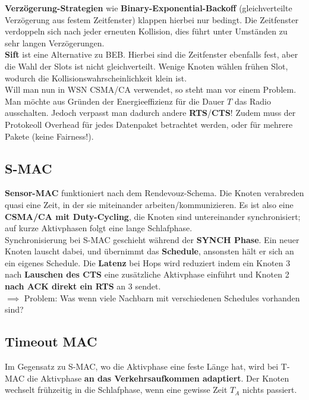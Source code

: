 \documentclass[a4paper]{article}
\begin{document}
\textbf{Verzögerung-Strategien} wie \textbf{Binary-Exponential-Backoff} (gleichverteilte Verzögerung aus festem Zeitfenster) klappen hierbei nur bedingt. Die Zeitfenster verdoppeln sich nach jeder erneuten Kollision, dies führt unter Umständen zu sehr langen Verzögerungen.\\

\textbf{Sift} ist eine Alternative zu BEB. Hierbei sind die Zeitfenster ebenfalls fest, aber die Wahl der Slots ist nicht gleichverteilt. Wenige Knoten wählen frühen Slot, wodurch die Kollisionswahrscheinlichkeit klein ist.\\

Will man nun in WSN CSMA/CA verwendet, so steht man vor einem Problem. Man möchte aus Gründen der Energieeffizienz für die Dauer $T$ das Radio ausschalten. Jedoch verpasst man dadurch andere \textbf{RTS}/\textbf{CTS}! Zudem muss der Protokeoll Overhead für jedes Datenpaket betrachtet werden, oder für mehrere Pakete (keine Fairness!).

\subsection{S-MAC}
\textbf{Sensor-MAC} funktioniert nach dem Rendevouz-Schema. Die Knoten verabreden quasi eine Zeit, in der sie miteinander arbeiten/kommunizieren. Es ist also eine \textbf{CSMA/CA mit Duty-Cycling}, die Knoten sind untereinander synchronisiert; auf kurze Aktivphasen folgt eine lange Schlafphase.\\

Synchronisierung bei S-MAC geschieht während der \textbf{SYNCH Phase}. Ein neuer Knoten lauscht dabei, und übernimmt das \textbf{Schedule}, ansonsten hält er sich an ein eigenes Schedule. Die \textbf{Latenz} bei Hops wird reduziert indem ein Knoten 3 nach \textbf{Lauschen des CTS} eine zusätzliche Aktivphase einführt und Knoten 2 \textbf{nach ACK direkt ein RTS} an 3 sendet.\\

$\implies$ Problem: Was wenn viele Nachbarn mit verschiedenen Schedules vorhanden sind?

\subsection{Timeout MAC}
Im Gegensatz zu S-MAC, wo die Aktivphase eine feste Länge hat, wird bei T-MAC die Aktivphase \textbf{an das Verkehrsaufkommen adaptiert}. Der Knoten wechselt frühzeitig in die Schlafphase, wenn eine gewisse Zeit $T_A$ nichts passiert.\\
\end{document}

